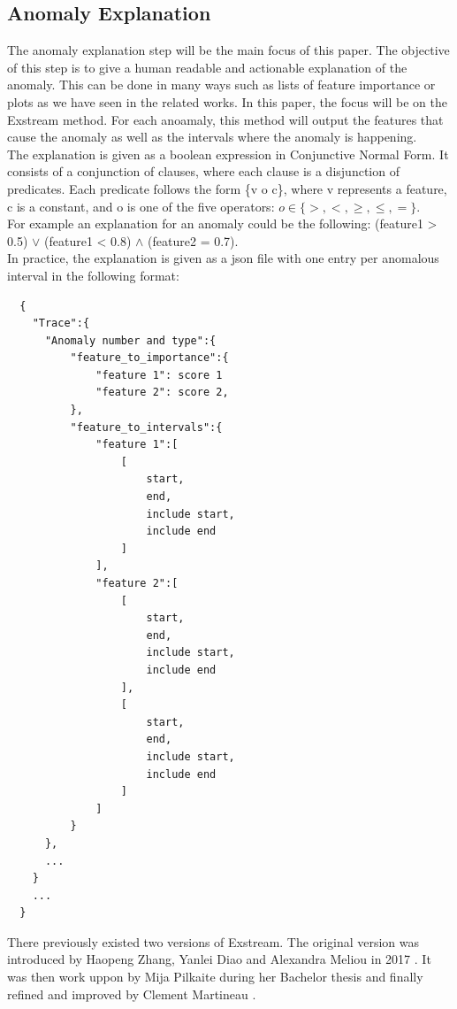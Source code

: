 \documentclass[oneside, a4paper, onecolumn, 11pt]{article}
\begin{document}
\subsection{Anomaly Explanation}
The anomaly explanation step will be the main focus of this paper. The objective of this step is to give a human readable and actionable explanation of the anomaly. This can be done in many ways such as lists of feature importance or plots as we have seen in the related works. In this paper, the focus will be on the Exstream method. For each anoamaly, this method will output the features that cause the anomaly as well as the intervals where the anomaly is happening.\\
The explanation is given as a boolean expression in Conjunctive Normal Form. It consists of a conjunction of clauses, where each clause is a disjunction of predicates. Each predicate follows the form \{v o c\}, where v represents a feature, c is a constant, and o is one of the five operators: $o\in\{>, <, \geq, \leq, =\}$.\\
For example an explanation for an anomaly could be the following: (feature1 > 0.5) $\lor$ (feature1 < 0.8) $\land$ (feature2 = 0.7).\\
In practice, the explanation is given as a json file with one entry per anomalous interval in the following format:
\begin{verbatim}
  {
    "Trace":{
      "Anomaly number and type":{
          "feature_to_importance":{
              "feature 1": score 1
              "feature 2": score 2,
          },
          "feature_to_intervals":{
              "feature 1":[
                  [
                      start,
                      end,
                      include start,
                      include end
                  ]
              ],
              "feature 2":[
                  [
                      start,
                      end,
                      include start,
                      include end
                  ],
                  [
                      start,
                      end,
                      include start,
                      include end
                  ]
              ]
          }
      },
      ...
    }
    ...
  }
\end{verbatim}
\label{explanation_format}
There previously existed two versions of Exstream. The original version was introduced by Haopeng Zhang, Yanlei Diao and Alexandra Meliou  in 2017 \cite{Exstream}. It was then work uppon by Mija Pilkaite during her Bachelor thesis \cite{MijaExstream} and finally refined and improved by Clement Martineau \cite{ClementExstream}.\\
\end{document}
